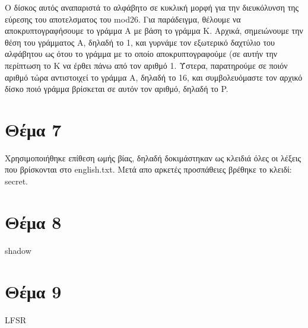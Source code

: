 \documentclass[a4paper, 11pt]{article}
\newcommand{\lt}{\latintext}
\begin{document}
Ο δίσκος αυτός αναπαριστά το αλφάβητο σε κυκλική μορφή για την διευκόλυνση της εύρεσης του αποτελσματος του {\lt mod26}. 
Για παράδειγμα, θέλουμε να αποκρυπτογραφήσουμε το γράμμα Α με βάση το γράμμα Κ.
Αρχικά, σημειώνουμε την θέση του γράμματος Α, δηλαδή το 1, και γυρνάμε τον εξωτερικό δαχτύλιο του αλφάβητου ως ότου το γράμμα με το οποίο αποκρυπτογραφούμε (σε αυτήν την περίπτωση το Κ να έρθει πάνω από τον αριθμό 1. Ύστερα, παρατηρούμε σε ποιόν αριθμό τώρα αντιστοιχεί το γράμμα Α, δηλαδή το 16, και συμβολευόμαστε τον αρχικό δίσκο ποιό γράμμα βρίσκεται σε αυτόν τον αριθμό, δηλαδή το {\lt P}.


\newpage


\section*{Θέμα 7}
Χρησιμοποιήθηκε επίθεση ωμής βίας, δηλαδή δοκιμάστηκαν ως κλειδιά όλες οι λέξεις που βρίσκονται στο {\lt english.txt}. Μετά απο αρκετές προσπάθειες
βρέθηκε το κλειδί: {\lt secret}.



\newpage


\section*{Θέμα 8}
shadow



\newpage


\section*{Θέμα 9}
LFSR
\end{document}

